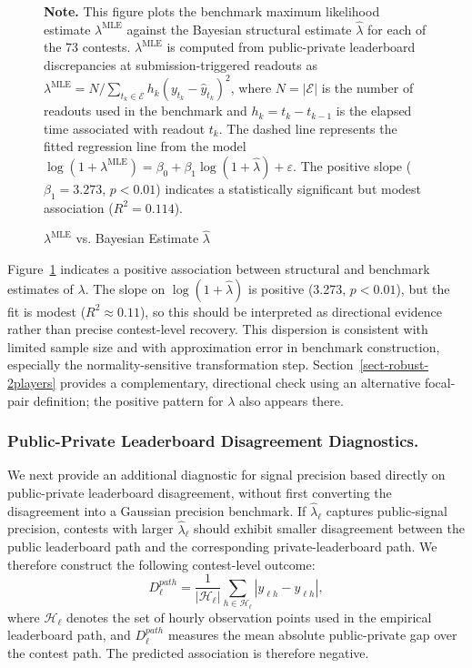 \documentclass[mnsc]{informs3}
\begin{document}
\begin{figure}[tbp]
\begin{minipage}[t]{0.53\textwidth}
\end{minipage}
\caption{$\lambda^{\text{MLE}}$ vs. Bayesian Estimate $\hat\lambda$}
\label{fig-validate-lambda}
\begin{minipage}{\textwidth}
{\footnotesize
\textbf{Note.} This figure plots the benchmark maximum likelihood estimate $\lambda^{\mathrm{MLE}}$ against the Bayesian structural estimate $\hat{\lambda}$ for each of the 73 contests. $\lambda^{\mathrm{MLE}}$ is computed from public-private leaderboard discrepancies at submission-triggered readouts as $\lambda^{\mathrm{MLE}} = N / \sum_{t_k\in\mathcal E} h_k (y_{t_k} - \hat{y}_{t_k})^2$, where $N=|\mathcal E|$ is the number of readouts used in the benchmark and $h_k=t_k-t_{k-1}$ is the elapsed time associated with readout $t_k$. The dashed line represents the fitted regression line from the model $\log(1 + \lambda^{\mathrm{MLE}}) = \beta_0 + \beta_1 \log(1 + \hat{\lambda}) + \varepsilon$. The positive slope ($\beta_1 = 3.273$, $p < 0.01$) indicates a statistically significant but modest association ($R^2 = 0.114$).
}
\end{minipage}
\end{figure}


Figure~\ref{fig-validate-lambda} indicates a positive association between structural and benchmark estimates of $\lambda$.
The slope on $\log(1+\hat\lambda)$ is positive (3.273, $p<0.01$), but the fit is modest ($R^2\approx0.11$), so this should be interpreted as directional evidence rather than precise contest-level recovery.
This dispersion is consistent with limited sample size and with approximation error in benchmark construction, especially the normality-sensitive transformation step.
Section~\ref{sect-robust-2players} provides a complementary, directional check using an alternative focal-pair definition; the positive pattern for $\lambda$ also appears there.


\subsubsection{Public-Private Leaderboard Disagreement Diagnostics.}
We next provide an additional diagnostic for signal precision based directly on public-private leaderboard disagreement, without first converting the disagreement into a Gaussian precision benchmark.
If $\hat\lambda_\ell$ captures public-signal precision, contests with larger $\hat\lambda_\ell$ should exhibit smaller disagreement between the public leaderboard path and the corresponding private-leaderboard path.
We therefore construct the following contest-level outcome:
\[
D_\ell^{path}
=
\frac{1}{|\mathcal H_\ell|}
\sum_{h\in\mathcal H_\ell}
\left|y_{\ell h}-\hat y_{\ell h}\right|,
\]
where $\mathcal H_\ell$ denotes the set of hourly observation points used in the empirical leaderboard path, and $D_\ell^{path}$ measures the mean absolute public-private gap over the contest path.
The predicted association is therefore negative.
\end{document}
